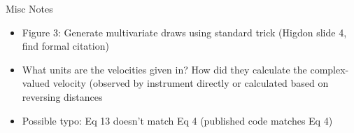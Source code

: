 \documentclass[12pt]{article}
\begin{document}
Misc Notes
\begin{itemize}
\item Figure 3: Generate multivariate draws using standard trick (Higdon slide 4, find formal citation)
\item What units are the velocities given in? How did they calculate the complex-valued velocity (observed by instrument directly or calculated based on reversing distances
\item Possible typo: Eq 13  doesn't match Eq 4 (published code matches Eq 4)
\end{itemize} 
\end{document}
